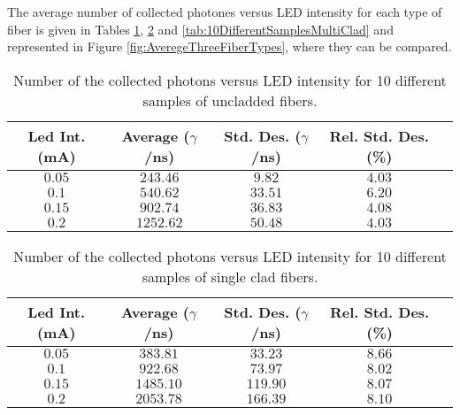 The average number of collected photones versus LED intensity for each type of fiber is given in Tables \ref{tab:10DifferentSamplesNoClad}, \ref{tab:10DifferentSamplesSingleClad} and \ref{tab:10DifferentSamplesMultiClad} and represented in Figure \ref{fig:AveregeThreeFiberTypes}, where they can be compared. 

\begin{table}[htbp]
\begin{center}
\begin{tabular}{|c|c|c|c|c|}
\hline
Led Int. (mA) & Average ($\gamma$/ns) & Std. Des. ($\gamma$/ns) & Rel. Std. Des. (\%)\\
\hline \hline \hline
$0.05$ & $243.46$ & $9.82$ & $4.03$ \\ \hline
$0.1$ & $540.62$ & $33.51$ & $6.20$ \\ \hline
$0.15$ & $902.74$ & $36.83$ & $4.08$ \\ \hline
$0.2$ & $1252.62$ & $50.48$ & $4.03$ \\ \hline
\end{tabular}
\caption{Number of the collected photons versus LED intensity for 10 different samples of uncladded fibers.}
\label{tab:10DifferentSamplesNoClad}
\end{center}
\end{table}

\begin{table}[htbp]
\begin{center}
\begin{tabular}{|c|c|c|c|c|}
\hline
Led Int. (mA) & Average ($\gamma$/ns) & Std. Des. ($\gamma$/ns) & Rel. Std. Des. (\%)\\
\hline \hline \hline
$0.05$ & $383.81$ & $33.23$ & $8.66$ \\ \hline
$0.1$ & $922.68$ & $73.97$ & $8.02$ \\ \hline
$0.15$ & $1485.10$ & $119.90$ & $8.07$ \\ \hline
$0.2$ & $2053.78$ & $166.39$ & $8.10$ \\ \hline
\end{tabular}
\caption{Number of the collected photons versus LED intensity for 10 different samples of single clad fibers.}
\label{tab:10DifferentSamplesSingleClad}
\end{center}
\end{table}

